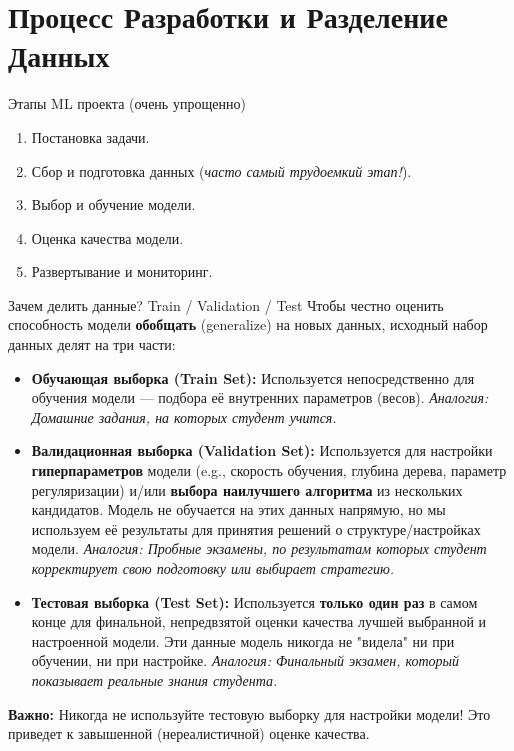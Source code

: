     \section{Процесс Разработки и Разделение Данных}
    
    \begin{textbox}{Этапы ML проекта (очень упрощенно)}
    \begin{enumerate}
        \item Постановка задачи.
        \item Сбор и подготовка данных (\textit{часто самый трудоемкий этап!}).
        \item Выбор и обучение модели.
        \item Оценка качества модели.
        \item Развертывание и мониторинг.
    \end{enumerate}
    \end{textbox}
    
    \begin{myexampleblock}{Зачем делить данные? Train / Validation / Test}
    Чтобы честно оценить способность модели \textbf{обобщать} (generalize) на новых данных, исходный набор данных делят на три части:
    
    \begin{itemize}
        \item \textbf{Обучающая выборка (Train Set):} Используется непосредственно для обучения модели — подбора её внутренних параметров (весов). \textit{Аналогия: Домашние задания, на которых студент учится.}
        \item \textbf{Валидационная выборка (Validation Set):} Используется для настройки \textbf{гиперпараметров} модели (e.g., скорость обучения, глубина дерева, параметр регуляризации) и/или \textbf{выбора наилучшего алгоритма} из нескольких кандидатов. Модель не обучается на этих данных напрямую, но мы используем её результаты для принятия решений о структуре/настройках модели. \textit{Аналогия: Пробные экзамены, по результатам которых студент корректирует свою подготовку или выбирает стратегию.}
        \item \textbf{Тестовая выборка (Test Set):} Используется \textbf{только один раз} в самом конце для финальной, непредвзятой оценки качества лучшей выбранной и настроенной модели. Эти данные модель никогда не "видела" ни при обучении, ни при настройке. \textit{Аналогия: Финальный экзамен, который показывает реальные знания студента.}
    \end{itemize}
    
    \textbf{Важно:} Никогда не используйте тестовую выборку для настройки модели! Это приведет к завышенной (нереалистичной) оценке качества.
    \end{myexampleblock}
    
